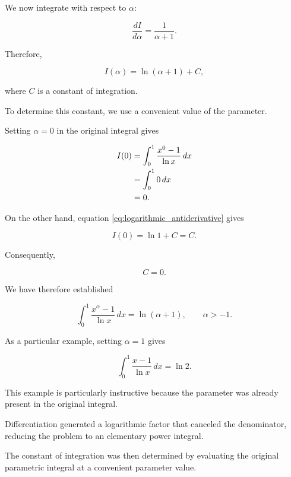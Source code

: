 \documentclass[11pt,a4paper]{article}
\theoremstyle{definition}
\theoremstyle{remark}
\begin{document}
We now integrate with respect
to $\alpha$:

\[
    \frac{dI}{d\alpha}
    =
    \frac{1}{\alpha+1}.
\]

Therefore,

\begin{equation}
    I(\alpha)
    =
    \ln(\alpha+1)+C,
    \label{eq:logarithmic_antiderivative}
\end{equation}

where $C$ is a constant
of integration.

To determine this constant,
we use a convenient value
of the parameter.

Setting $\alpha=0$ in
the original integral gives

\begin{align}
    I(0)
    &=
    \int_0^1
    \frac{x^0-1}{\ln x}\,dx
    \notag\\
    &=
    \int_0^1 0\,dx
    \notag\\
    &=0.
\end{align}

On the other hand,
equation
\eqref{eq:logarithmic_antiderivative}
gives

\[
    I(0)=\ln 1+C=C.
\]

Consequently,

\[
    C=0.
\]

We have therefore established

\begin{equation}
    \boxed{
    \int_0^1
    \frac{x^\alpha-1}{\ln x}\,dx
    =
    \ln(\alpha+1),
    \qquad \alpha>-1.
    }
    \label{eq:logarithmic_final}
\end{equation}

As a particular example,
setting $\alpha=1$ gives

\begin{equation}
    \boxed{
    \int_0^1
    \frac{x-1}{\ln x}\,dx
    =
    \ln 2.
    }
    \label{eq:logarithmic_special}
\end{equation}

\medskip

This example is particularly
instructive because the
parameter was already present
in the original integral.

Differentiation generated
a logarithmic factor that
canceled the denominator,
reducing the problem to
an elementary power integral.

The constant of integration
was then determined by
evaluating the original
parametric integral at
a convenient parameter value.
\end{document}
